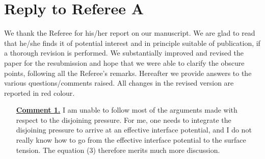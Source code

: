 \documentclass[12pt,english]{article}
\begin{document}

\section*{Reply to Referee A}
We thank the Referee for his/her report on our manuscript. 
We are glad to read that he/she finds it of potential interest and in principle 
suitable of publication, if a thorough revision is performed. 
We substantially improved and revised the paper for the resubmission and hope that we were able to clarify the obscure points, following all the Referee's remarks.
Hereafter we provide answers to the various questions/comments raised. All changes in the revised version are reported in red colour.

\begin{itemize}

\item[ \textbf{\underline{Comment 1.}}]
{ 
I am unable to follow most of the arguments made with respect to the disjoining pressure. 
For me, one needs to integrate the disjoining pressure to arrive at an effective interface potential, and 
I do not really know how to go from the effective interface potential to the surface tension. 
The equation (3) therefore merits much more discussion.
}


\end{itemize}
\end{document}
